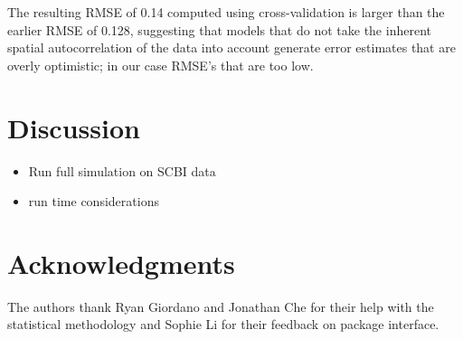 \documentclass[12pt]{article}
\providecommand{\tightlist}{%
  \setlength{\itemsep}{0pt}\setlength{\parskip}{0pt}}
\newenvironment{Shaded}{\begin{snugshade}}{\end{snugshade}}
\newcommand{\CommentTok}[1]{\textcolor[rgb]{0.56,0.35,0.01}{\textit{#1}}}
\newcommand{\DataTypeTok}[1]{\textcolor[rgb]{0.13,0.29,0.53}{#1}}
\newcommand{\KeywordTok}[1]{\textcolor[rgb]{0.13,0.29,0.53}{\textbf{#1}}}
\newcommand{\NormalTok}[1]{#1}
\newcommand{\OperatorTok}[1]{\textcolor[rgb]{0.81,0.36,0.00}{\textbf{#1}}}
\newcommand{\StringTok}[1]{\textcolor[rgb]{0.31,0.60,0.02}{#1}}
\begin{document}
\begin{Shaded}
\end{Shaded}

\begin{Shaded}
\end{Shaded}

The resulting RMSE of 0.14 computed using cross-validation is larger
than the earlier RMSE of 0.128, suggesting that models that do not take
the inherent spatial autocorrelation of the data into account generate
error estimates that are overly optimistic; in our case RMSE's that are
too low.

\hypertarget{discussion}{%
\section{Discussion}\label{discussion}}

\begin{itemize}
\tightlist
\item
  Run full simulation on SCBI data
\item
  run time considerations
\end{itemize}

\hypertarget{acknowledgments}{%
\section{Acknowledgments}\label{acknowledgments}}

The authors thank Ryan Giordano and Jonathan Che for their help with the
statistical methodology and Sophie Li for their feedback on package
interface.



\end{document}
